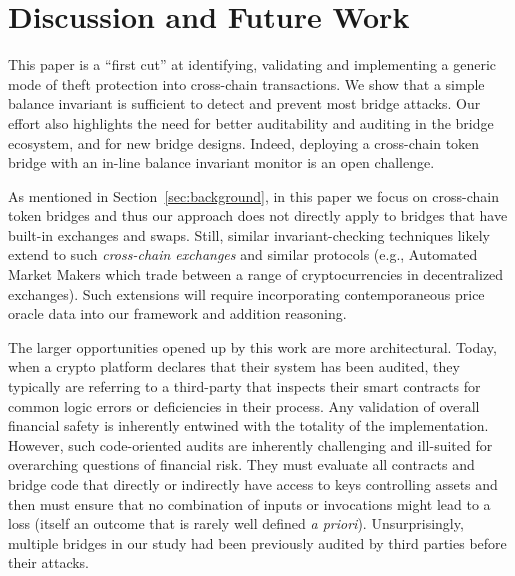\section{Discussion and Future Work}

\label{sec:discuss}
This paper is a ``first cut'' at identifying, validating and implementing a
generic mode of theft protection into cross-chain transactions. We show that a
simple balance invariant is sufficient to detect and prevent most bridge
attacks. Our effort also highlights the need for better auditability and
auditing in the bridge ecosystem, and for new bridge designs.  Indeed, deploying a cross-chain token bridge with an in-line balance invariant
monitor is an open challenge.

As mentioned in Section~\ref{sec:background}, in this paper we focus on
cross-chain token bridges and thus our approach does not directly apply to
bridges that have built-in exchanges and swaps.  Still, similar
invariant-checking techniques likely extend to such \emph{cross-chain exchanges}
and similar protocols (e.g., Automated Market Makers which trade between a
range of cryptocurrencies in decentralized exchanges). Such extensions will
require incorporating contemporaneous price oracle data
into our framework
and addition reasoning.

The larger opportunities opened up by this work are
more architectural.  Today, when a crypto platform declares that their
system has been audited, they typically are referring to a third-party
that inspects their smart contracts for common logic errors or
deficiencies in their process.  Any validation of overall financial
safety is inherently entwined with the totality of the implementation.
However, such code-oriented audits are inherently challenging and
ill-suited for overarching questions of financial risk.  They must
evaluate all contracts and bridge code that directly or indirectly
have access to keys controlling assets and then must ensure that no
combination of inputs or invocations might lead to a loss (itself an
outcome that is rarely well defined \emph{a priori}).  Unsurprisingly,
multiple bridges in our study had been previously audited by third
parties before their attacks.

